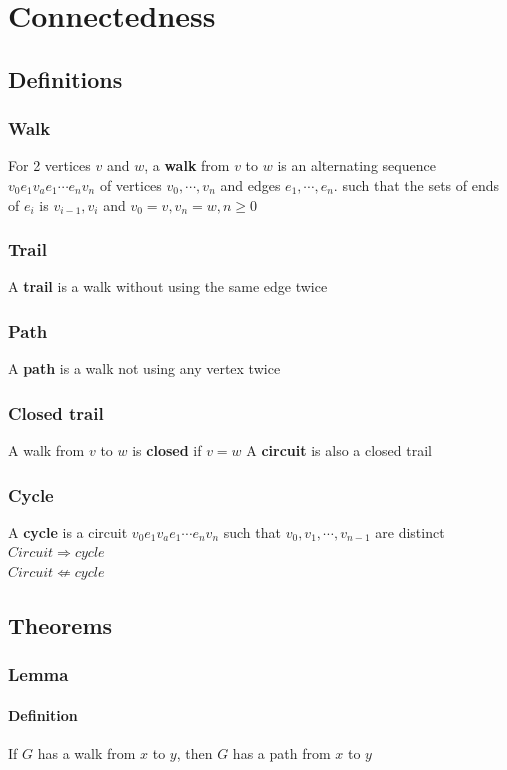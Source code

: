 \chapter{Connectedness}

\section{Definitions}
    \subsection{Walk}
        For 2 vertices $v$ and $w$, a \textbf{walk} from $v$ to $w$ is an alternating sequence $v_0 e_1 v_a e_1 \cdots e_n v_n$ of vertices $v_0, \cdots, v_n$ and edges $e_1, \cdots, e_n$. such  that the sets of ends of $e_i$ is {$v_{i-1} , v_i$} and $v_0 =v, v_n=w, n \geq 0$
    \subsection{Trail}
        A \textbf{trail} is a walk without using the same edge twice
    \subsection{Path}
        A \textbf{path} is a walk not using any vertex twice
    \subsection{Closed trail}
        A walk from $v$ to $w$ is \textbf{closed} if $v=w$
        A \textbf{circuit} is also a closed trail
    \subsection{Cycle}
        A \textbf{cycle} is a circuit $v_0 e_1 v_a e_1 \cdots e_n v_n$ such that $v_0, v_1, \cdots, v_{n-1}$ are distinct\\
        $Circuit\Rightarrow cycle$\\
        $Circuit\not\Leftarrow cycle$
\section{Theorems}
    \subsection{Lemma}
        \subsubsection{Definition}
             If $G$ has a walk from $x$ to $y$, then $G$ has a path from $x$ to $y$
